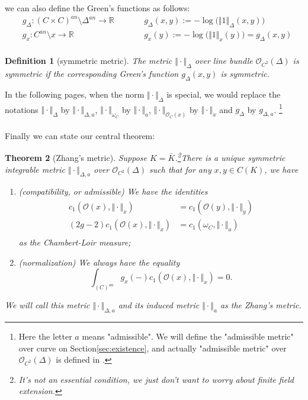 \documentclass[reqno,11pt]{amsart}
\numberwithin{equation}{section}
\theoremstyle{plain}
\newtheorem{theorem}{Theorem}[section]
\newtheorem{defn}[theorem]{Definition}
\theoremstyle{plain}
\numberwithin{equation}{section}
\theoremstyle{remark}
\newcommand{\norm}[1]{\Vert{#1}\Vert}
\begin{document}
we can also define the Green's functions as follows:
\begin{equation*}
\begin{aligned}
 &g_{\Delta}:(C \times C)^{an} \setminus \Delta^{an} \longrightarrow \mathbb{R} \qquad  &&g_{\Delta}(x,y):=-\log \big(\norm{1}_{\Delta}(x,y)\big)  \\
 &g_{x}:C^{an} \setminus {x} \longrightarrow \mathbb{R} \qquad  &&g_{x}(y):=-\log \big(\norm{1}_{x}(y)\big) =g_{\Delta}(x,y) \\
\end{aligned}
\end{equation*}
\begin{defn}[symmetric metric]
The metric $\norm{\cdot}_{\Delta}$ over line bundle $\mathcal{O}_{C^2}(\Delta)$ is symmetric if the corresponding Green's function $g_{\Delta}(x,y)$ is symmetric.
\end{defn}
In the following pages, when the norm  $\norm{\cdot}_{\Delta}$ is special, we would replace the notations $\norm{\cdot}_{\Delta}$ by $\norm{\cdot}_{\Delta,a}$, $\norm{\cdot}_{\omega_C}$ by $\norm{\cdot}_{a}$, $\norm{\cdot}_{\mathcal{O}_C(x)}$ by $\norm{\cdot}_{x}$ and $g_{\Delta}$ by $g_{\Delta,a}$. \footnote{Here the letter $a$ means "admissible". We will define the "admissible metric" over curve on Section\ref{sec:existence}, and actually "admissible metric" over $\mathcal{O}_{C^2}(\Delta)$ is defined in \cite[???]{yuan2021arithmetic}.}
\\
\\

Finally we can state our central theorem:
\begin{theorem}[Zhang's metric]\label{thm:main}
Suppose $K=\bar{K}$.\footnote{It's not an essential condition, we just don't want to worry about finite field extension.}There is a unique symmetric integrable metric $\norm{\cdot}_{\Delta,a}$ over $\mathcal{O}_{C^2}(\Delta)$ such that for any $x,y \in C(K)$, we have
\begin{enumerate}[(1)]
\item (compatibility, or admissible) We have the identities
\begin{equation*}
\begin{aligned}
  c_1(\mathcal{O}(x),\norm{\cdot}_x)&=c_1(\mathcal{O}(y),\norm{\cdot}_y)  \\ 
  (2g-2)c_1(\mathcal{O}(x),\norm{\cdot}_x)&=c_1(\omega_C,\norm{\cdot}_a)  \\ 
\end{aligned}
\end{equation*}
as the Chambert-Loir measure;
\item (normalization) We always have the equality
$$\int_{(C)^{an}} g_x(-) c_1(\mathcal{O}(x),\norm{\cdot}_x) =0.$$
\end{enumerate}
We will call this metric $\norm{\cdot}_{\Delta,a}$ and its induced metric $\norm{\cdot}_{a}$ as the Zhang's metric.
\end{theorem}
\end{document}
